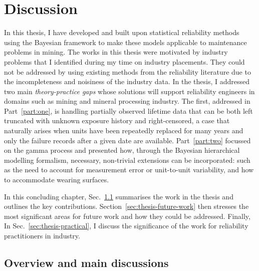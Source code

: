\chapter{Discussion}\label{chap:chapter7}

In this thesis, I have developed and built upon statistical reliability methods using the Bayesian framework to make these models applicable to maintenance problems in mining. The works in this thesis were motivated by industry problems that I identified during my time on industry placements. They could not be addressed by using existing methods from the reliability literature due to the incompleteness and noisiness of the industry data. In the thesis, I addressed two main \textit{theory-practice gaps} whose solutions will support reliability engineers in domains such as mining and mineral processing industry. The first, addressed in Part~\ref{part:one}, is handling partially observed lifetime data that can be both left truncated with unknown exposure history and right-censored, a case that naturally arises when units have been repeatedly replaced for many years and only the failure records after a given date are available. Part~\ref{part:two} focussed on the gamma process and presented how, through the Bayesian hierarchical modelling formalism, necessary, non-trivial extensions can be incorporated: such as the need to account for measurement error or unit-to-unit variability, and how to accommodate wearing surfaces.

In this concluding chapter, Sec.~\ref{sec:thesis-summary} summarises the work in the thesis and outlines the key contributions. Section~\ref{sec:thesis-future-work} then stresses the most significant areas for future work and how they could be addressed. Finally, In Sec.~\ref{sec:thesis-practical}, I discuss the significance of the work for reliability practitioners in industry.

\section{Overview and main discussions} \label{sec:thesis-summary}

